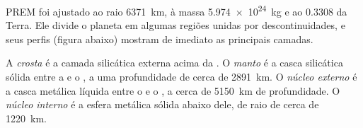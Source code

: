 PREM foi ajustado ao raio \qty{6371}{km}, à massa \qty{5.974e24}{kg} e ao  $0.3308$ da Terra. Ele divide o planeta em algumas regiões unidas por descontinuidades, e seus perfis (figura abaixo) mostram de imediato as principais camadas.

\begin{definition}\label{def:b1:layered-earth:layers}
A \emph{crosta} é a camada silicática externa acima da . O \emph{manto} é a casca silicática sólida entre a  e o , a uma profundidade de cerca de \qty{2891}{km}. O \emph{núcleo externo} é a casca metálica líquida entre o  e o , a cerca de \qty{5150}{km} de profundidade. O \emph{núcleo interno} é a esfera metálica sólida abaixo dele, de raio de cerca de \qty{1220}{km}.
\end{definition}

